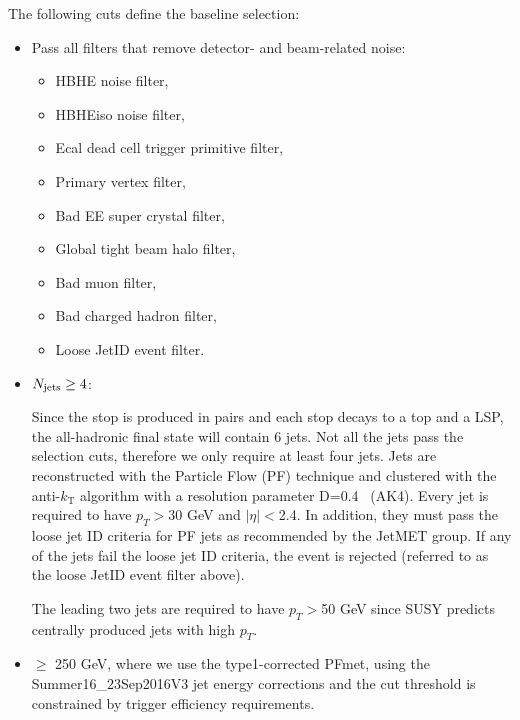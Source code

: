 The following cuts define the baseline selection:

\begin{itemize}
\item Pass all filters that remove detector- and beam-related noise: 
  \begin{itemize}
    \item HBHE noise filter, 
    \item HBHEiso noise filter, 
    \item Ecal dead cell trigger primitive filter,
    \item Primary vertex filter,
    \item Bad EE super crystal filter,
    \item Global tight beam halo filter,
    \item Bad muon filter,
    \item Bad charged hadron filter,
    \item Loose JetID event filter.
  \end{itemize}

\item $N_{\text{jets}}\geq4$:

Since the stop is produced in pairs and each stop decays to a top and a LSP, the all-hadronic final state will contain 6 jets. Not all the jets pass the selection cuts, therefore we only require at least four jets.
Jets are reconstructed with the Particle Flow (PF) technique
and clustered with the anti-$k_\mathrm{T}$ algorithm with a resolution 
parameter D=0.4~\cite{Cacciari:2008gp} (AK4). Every jet
is required to have $p_{T}>$30 GeV and $|\eta|<$2.4. In addition, they must 
pass the loose jet ID criteria for PF jets as recommended by the JetMET group. 
If any of the jets fail the loose jet ID criteria, the event
is rejected (referred to as the loose JetID event filter
above).

The leading two jets are required to have 
$p_{T}>$50 GeV since SUSY predicts centrally produced jets with 
high $p_{T}$.

\item \MET $\ge$ 250 GeV, where we use the type1-corrected PFmet, using the Summer16\_23Sep2016V3 jet energy corrections and the cut threshold is constrained by trigger
efficiency requirements.


\end{itemize}
